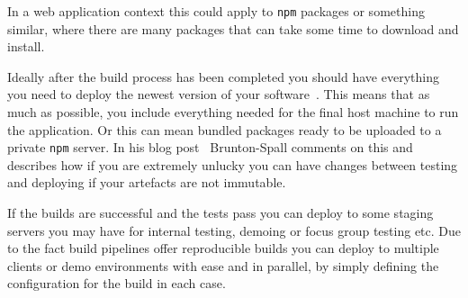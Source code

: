 In a web application context this could apply to \texttt{npm} packages or something similar,
where there are many packages that can take some time to download and install.
\par
Ideally after the build process has been completed you should have everything you need to deploy the newest version of your software~\cite{BruntonBuild}.
This means that as much as possible, you include everything needed for the final host machine to run the application.
Or this can mean bundled packages ready to be uploaded to a private \texttt{npm} server.
In his blog post~\cite{BruntonBuild} Brunton-Spall comments on this and describes
how if you are extremely unlucky you can have changes between testing and deploying if your artefacts are not immutable.
\par
If the builds are successful and the tests pass you can deploy to some staging servers you may have for internal testing, demoing or focus group testing etc.
Due to the fact build pipelines offer reproducible builds you can deploy to multiple clients or demo environments with ease and in parallel,
by simply defining the configuration for the build in each case.
